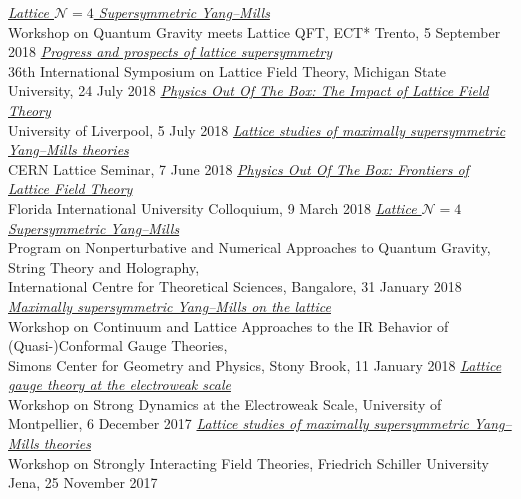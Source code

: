 \begin{spacelist}
\begin{revnumerate}
    \pagebreakitem
      \textit{\href{http://www.davidschaich.net/talks/1809ECT.pdf}{Lattice $\mathcal N = 4$ Supersymmetric Yang--Mills}} \\
      Workshop on Quantum Gravity meets Lattice QFT, ECT* Trento, 5 September 2018
    \pagebreakitem
      \textit{\href{http://www.davidschaich.net/talks/1807Lattice.pdf}{Progress and prospects of lattice supersymmetry}} \\
      36th International Symposium on Lattice Field Theory, Michigan State University, 24 July 2018
    \pagebreakitem
      \textit{\href{http://www.davidschaich.net/talks/1807Liverpool.pdf}{Physics Out Of The Box: The Impact of Lattice Field Theory}} \\
      University of Liverpool, 5 July 2018
    \pagebreakitem
      \textit{\href{http://www.davidschaich.net/talks/1806CERN.pdf}{Lattice studies of maximally supersymmetric Yang--Mills theories}} \\
      CERN Lattice Seminar, 7 June 2018
    \pagebreakitem
      \textit{\href{http://www.davidschaich.net/talks/1803FIU.pdf}{Physics Out Of The Box: Frontiers of Lattice Field Theory}} \\
      Florida International University Colloquium, 9 March 2018
    \pagebreakitem
      \textit{\href{http://www.davidschaich.net/talks/1801Bangalore.pdf}{Lattice $\mathcal N = 4$ Supersymmetric Yang--Mills}} \\
      Program on Nonperturbative and Numerical Approaches to Quantum Gravity, String Theory and Holography, \\ International Centre for Theoretical Sciences, Bangalore, 31 January 2018
    \pagebreakitem
      \textit{\href{http://www.davidschaich.net/talks/1801StonyBrook.pdf}{Maximally supersymmetric Yang--Mills on the lattice}} \\
      Workshop on Continuum and Lattice Approaches to the IR Behavior of (Quasi-)Conformal Gauge Theories, \\ Simons Center for Geometry and Physics, Stony Brook, 11 January 2018
    \pagebreakitem
      \textit{\href{http://www.davidschaich.net/talks/1712Montpellier.pdf}{Lattice gauge theory at the electroweak scale}} \\
      Workshop on Strong Dynamics at the Electroweak Scale, University of Montpellier, 6 December 2017
    \pagebreakitem
      \textit{\href{http://www.davidschaich.net/talks/1711Jena.pdf}{Lattice studies of maximally supersymmetric Yang--Mills theories}} \\
      Workshop on Strongly Interacting Field Theories, Friedrich Schiller University Jena, 25 November 2017

\end{revnumerate}
\end{spacelist}
